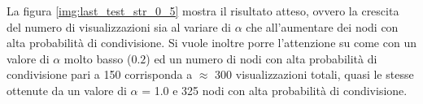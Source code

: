 La figura \ref{img:last_test_str_0_5} mostra il risultato atteso, 
ovvero la crescita del numero di visualizzazioni sia al variare di $\alpha$ che all'aumentare 
dei nodi con alta probabilità di condivisione.
Si vuole inoltre porre l'attenzione su come con un valore di $\alpha$ 
molto basso ($0.2$) ed un numero di nodi con alta probabilità di condivisione pari a 150 corrisponda 
a $\approx$ 300 visualizzazioni totali, quasi le stesse ottenute da un valore di $\alpha$ = 1.0 e 325 nodi con 
alta probabilità di condivisione.















